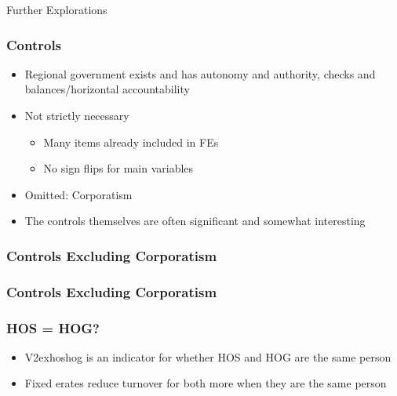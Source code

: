 \documentclass{beamer}
\begin{document}
    \begin{frame}
        \centering Further Explorations
    \end{frame}

    \begin{frame}
        \frametitle{Controls}
        \begin{itemize}
            \item Regional government exists and has autonomy and authority, checks and balances/horizontal accountability
            \item Not strictly necessary
                \begin{itemize}
                    \item Many items already included in FEs
                    \item No sign flips for main variables
                \end{itemize}
            \item Omitted: Corporatism
            \item The controls themselves are often significant and somewhat interesting
        \end{itemize}
    \end{frame}

    \begin{frame}
        \frametitle{Controls Excluding Corporatism}
        {
            \let\oldcentering\centering
            \renewcommand\centering{\tiny\oldcentering}
            
        }
    \end{frame}

    \begin{frame}
        \frametitle{Controls Excluding Corporatism}
        {
            \let\oldcentering\centering
            \renewcommand\centering{\tiny\oldcentering}
            
        }
    \end{frame}

    \begin{frame}
        \frametitle{HOS = HOG?}
        \begin{itemize}
            \item V2exhoshog is an indicator for whether HOS and HOG are the same person
            \item Fixed erates reduce turnover for both more when they are the same person
        \end{itemize}
    \end{frame}
\end{document}
